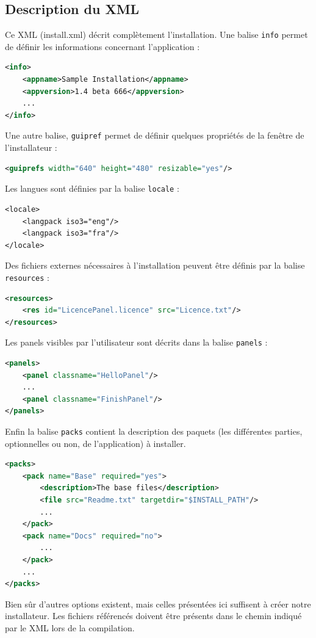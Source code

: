 \subsection{Description du XML}
Ce XML (install.xml) décrit complètement l'installation.
Une balise \verb|info| permet de définir les informations concernant l'application :
\begin{lstlisting}[language=XML]
<info>
	<appname>Sample Installation</appname>
	<appversion>1.4 beta 666</appversion>
	...
</info>
\end{lstlisting}
Une autre balise, \verb|guipref| permet de définir quelques propriétés de la fenêtre de l'installateur :
\begin{lstlisting}[language=XML]
<guiprefs width="640" height="480" resizable="yes"/>
\end{lstlisting}
Les langues sont définies par la balise \verb|locale| :
\begin{lstlisting}
<locale>
	<langpack iso3="eng"/>
	<langpack iso3="fra"/>
</locale>
\end{lstlisting}
Des fichiers externes nécessaires à l'installation peuvent être définis par la balise \verb|resources| :
\begin{lstlisting}[language=XML]
<resources>
	<res id="LicencePanel.licence" src="Licence.txt"/>
</resources>
\end{lstlisting}
Les panels visibles par l'utilisateur sont décrits dans la balise \verb|panels| :
\begin{lstlisting}[language=XML]
<panels>
	<panel classname="HelloPanel"/>
	...
	<panel classname="FinishPanel"/>
</panels>
\end{lstlisting}
Enfin la balise \verb|packs| contient la description des paquets (les différentes parties, optionnelles ou non, de l'application) à installer.
\begin{lstlisting}[language=XML]
<packs>
	<pack name="Base" required="yes">
		<description>The base files</description>
		<file src="Readme.txt" targetdir="$INSTALL_PATH"/>
		...
	</pack>
	<pack name="Docs" required="no">
		...
	</pack>
	...
</packs>
\end{lstlisting}
Bien sûr d'autres options existent, mais celles présentées ici suffisent à créer notre installateur.
Les fichiers référencés doivent être présents dans le chemin indiqué par le XML lors de la compilation.
